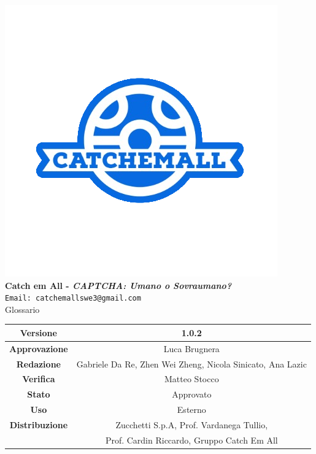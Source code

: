 \begin{titlepage}
\begin{center}
	\includegraphics[scale = 1.5]{img/logo.png}\\
	\bigskip
	\large \textbf{Catch em All - \textit{CAPTCHA: Umano o Sovraumano?}}\\
	\texttt{Email: catchemallswe3@gmail.com}\\
	\vfill
	{\fontsize{1.5cm}{0}\selectfont Glossario}\\
	\vfill
	\setlength\extrarowheight{5pt}
	\begin{tabularx}{\textwidth}{| c | c |}
		\hline
		\textbf{Versione} & 1.0.2\\
		\hline
		\textbf{Approvazione} & Luca Brugnera \\
		\hline
		\textbf{Redazione} & Gabriele Da Re, Zhen Wei Zheng, Nicola Sinicato, Ana Lazic\\
		\hline
		\textbf{Verifica} & Matteo Stocco\\
		\hline
		\textbf{Stato} & Approvato\\
		\hline
		\textbf{Uso} & Esterno\\
		\hline
		\textbf{Distribuzione} & Zucchetti S.p.A, Prof. Vardanega Tullio, \\
		&  Prof. Cardin Riccardo, Gruppo Catch Em All\\
		\hline
	\end{tabularx}
\end{center}
\end{titlepage} 
